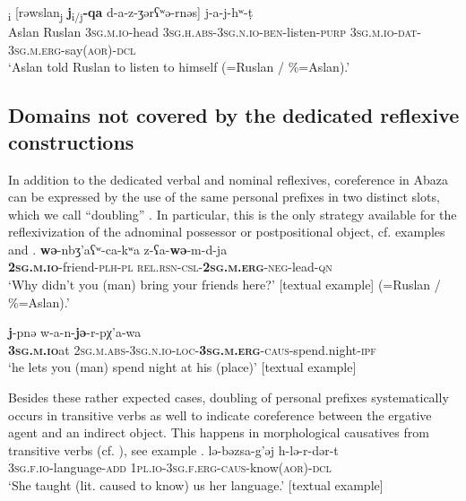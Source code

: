 \documentclass[output=paper]{langscibook}
\begin{document}
\ea 
    \label{ex:Arkadiev:41}
    \textsubscript{i}  [{r{ə}wslan}\textsubscript{j}  \textbf{{j}}\textsubscript{i/j}\textbf{{}-}\textbf{{qa}}  {d-a-z-{ʒ}{ə}r{ʕ}{ʷ}{ə}-rn{ə}s}] {j-a-j-h{ʷ}-t{̣}}\\
   Aslan  Ruslan   \textsc{3sg.m.io}{}-head  \textsc{3sg.h.abs-3sg.n.io-ben}{}-listen\textsc{{}-purp} \textsc{3sg.m.io-dat-3sg.m.erg}{}-say(\textsc{aor)-dcl}\\
    \glt ‘Aslan told Ruslan to listen to himself (=Ruslan / \%=Aslan).’
\z



\subsection{Domains not covered by the dedicated reflexive constructions}\label{sec:Arkadiev:2.3}

In addition to the dedicated verbal and nominal reflexives, coreference in Abaza can be %
%
expressed by the use of the same personal prefixes in two distinct slots, which we call “doubling” . In particular, this is the only strategy available for the reflexivization of the adnominal possessor or postpositional object, cf. examples  and .
\ea 
    \label{ex:Arkadiev:42}
    \gll \textbf{w{ə}}-nb{ʒ}’a{ʕ}{ʷ}-ca-k{ʷ}a z-{ʕ}a-\textbf{{w{ə}}}{{}-m-d-ja}\\
   \textbf{\textsc{2sg.m.io}}{}-friend-\textsc{plh-pl}  \textsc{rel.rsn-csl-}\textbf{\textsc{2sg.m.erg}}\textsc{-neg-}lead-\textsc{qn}\\
    \glt ‘Why didn’t you (man) bring your friends here?’ [textual example] (=Ruslan / \%=Aslan).’
\z

\ea 
    \label{ex:Arkadiev:43}
    \gll \textbf{{j}}{}-pn{ə}  w-a-n-\textbf{{j{ə}}}{{}-r-pχ’a-wa}\\
   \textbf{\textsc{3sg.m.io}}at  \textsc{2sg.m.abs-3sg.n.io-loc-}\textbf{\textsc{3sg.m.erg}}\textsc{-caus}-spend.night-\textsc{ipf}\\
    \glt ‘he lets you (man) spend night at his (place)’ [textual example]
\z


Besides these rather expected cases, doubling of personal prefixes systematically occurs in transitive verbs as well to indicate coreference between the ergative agent and an indirect object. This happens in morphological causatives from transitive verbs (cf. \citealt[188]{Tabulova1976}), see example . 
\ea 
\label{ex:Arkadiev:44}
    \ea 
    \label{ex:Arkadiev:44a}
    \gll l{ə}-b{ə}zsa-g’{ə}j  h-l{ə}-r-d{ə}r-t\\
      \textsc{3sg.f.io}{}-language-\textsc{add}  \textsc{1pl.io-3sg.f.erg-caus}-know(\textsc{aor)-dcl}\\
    \glt ‘She taught (lit. caused to know) us her language.’ [textual example] 
    
\end{document}
